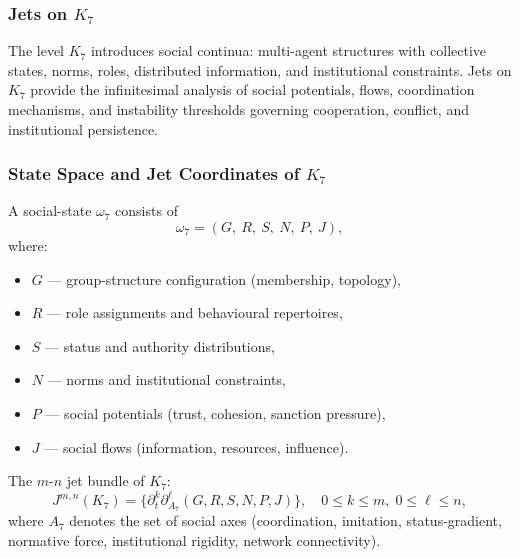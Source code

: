 
\subsubsection{Jets on \texorpdfstring{$K_7$}{K_7}}
\label{sec:jets-k7}

The level $K_7$ introduces social continua: multi-agent structures with
collective states, norms, roles, distributed information, and
institutional constraints. Jets on $K_7$ provide the infinitesimal
analysis of social potentials, flows, coordination mechanisms, and
instability thresholds governing cooperation, conflict, and institutional
persistence.


\subsubsection{State Space and Jet Coordinates of \texorpdfstring{$K_7$}{K_7}}

A social-state $\omega_7$ consists of
\[
\omega_7 = 
(G,\ R,\ S,\ N,\ P,\ J),
\]
where:
\begin{itemize}
    \item $G$ — group-structure configuration (membership, topology),
    \item $R$ — role assignments and behavioural repertoires,
    \item $S$ — status and authority distributions,
    \item $N$ — norms and institutional constraints,
    \item $P$ — social potentials (trust, cohesion, sanction pressure),
    \item $J$ — social flows (information, resources, influence).
\end{itemize}

The $m$-$n$ jet bundle of $K_7$:
\[
J^{m,n}(K_7)
=
\big\{
\partial_t^k \partial_{A_7}^\ell (G,R,S,N,P,J)
\big\},
\quad
0\le k\le m,\; 0\le\ell\le n,
\]
where $A_7$ denotes the set of social axes (coordination, imitation,
status-gradient, normative force, institutional rigidity, network
connectivity).



